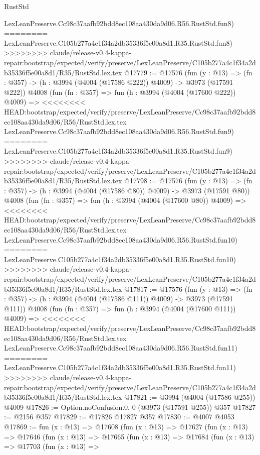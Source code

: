 \begin{lexlean}{RustStd}
\begin{coremodule}
{\begin{coremodule}
{{{{{{{{{{{{{{{{    LexLeanPreserve.Cc98c37aafb92bdd8ec108aa430da9d06.R56.RustStd.fun8)
========
    LexLeanPreserve.C105b277a4c1f34a2db35336f5e00a8d1.R35.RustStd.fun8)
>>>>>>>> claude/release-v0.4-kappa-repair:bootstrap/expected/verify/preserve/LexLeanPreserve/C105b277a4c1f34a2db35336f5e00a8d1/R35/RustStd.lex.tex
@17779 := @17576
    (fun (y : @13) => (fn : @357) -> (h : @3994 (@4004 (@17586 @222)) @4009) -> @3973 (@17591 @222))
    @4008
    (fun (fn : @357) =>
    fun (h : @3994 (@4004 (@17600 @222)) @4009) =>
<<<<<<<< HEAD:bootstrap/expected/verify/preserve/LexLeanPreserve/Cc98c37aafb92bdd8ec108aa430da9d06/R56/RustStd.lex.tex
    LexLeanPreserve.Cc98c37aafb92bdd8ec108aa430da9d06.R56.RustStd.fun9)
========
    LexLeanPreserve.C105b277a4c1f34a2db35336f5e00a8d1.R35.RustStd.fun9)
>>>>>>>> claude/release-v0.4-kappa-repair:bootstrap/expected/verify/preserve/LexLeanPreserve/C105b277a4c1f34a2db35336f5e00a8d1/R35/RustStd.lex.tex
@17798 := @17576
    (fun (y : @13) => (fn : @357) -> (h : @3994 (@4004 (@17586 @80)) @4009) -> @3973 (@17591 @80))
    @4008
    (fun (fn : @357) =>
    fun (h : @3994 (@4004 (@17600 @80)) @4009) =>
<<<<<<<< HEAD:bootstrap/expected/verify/preserve/LexLeanPreserve/Cc98c37aafb92bdd8ec108aa430da9d06/R56/RustStd.lex.tex
    LexLeanPreserve.Cc98c37aafb92bdd8ec108aa430da9d06.R56.RustStd.fun10)
========
    LexLeanPreserve.C105b277a4c1f34a2db35336f5e00a8d1.R35.RustStd.fun10)
>>>>>>>> claude/release-v0.4-kappa-repair:bootstrap/expected/verify/preserve/LexLeanPreserve/C105b277a4c1f34a2db35336f5e00a8d1/R35/RustStd.lex.tex
@17817 := @17576
    (fun (y : @13) => (fn : @357) -> (h : @3994 (@4004 (@17586 @111)) @4009) -> @3973 (@17591 @111))
    @4008
    (fun (fn : @357) =>
    fun (h : @3994 (@4004 (@17600 @111)) @4009) =>
<<<<<<<< HEAD:bootstrap/expected/verify/preserve/LexLeanPreserve/Cc98c37aafb92bdd8ec108aa430da9d06/R56/RustStd.lex.tex
    LexLeanPreserve.Cc98c37aafb92bdd8ec108aa430da9d06.R56.RustStd.fun11)
========
    LexLeanPreserve.C105b277a4c1f34a2db35336f5e00a8d1.R35.RustStd.fun11)
>>>>>>>> claude/release-v0.4-kappa-repair:bootstrap/expected/verify/preserve/LexLeanPreserve/C105b277a4c1f34a2db35336f5e00a8d1/R35/RustStd.lex.tex
@17821 := @3994 (@4004 (@17586 @255)) @4009
@17826 := Option.noConfusion.{0, 0} (@3973 (@17591 @255)) @357
@17827 := @2156 @357
@17829 := @17826 @17827 @357
@17830 := @4007 @4053
@17869 := fun (x : @13) =>
  @17608
    (fun (x : @13) =>
    @17627
      (fun (x : @13) =>
      @17646
        (fun (x : @13) =>
        @17665
          (fun (x : @13) =>
          @17684
            (fun (x : @13) =>
            @17703
              (fun (x : @13) =>
}}}}}}}}}}}}}}}}
\end{coremodule}}
\end{coremodule}
\end{lexlean}
